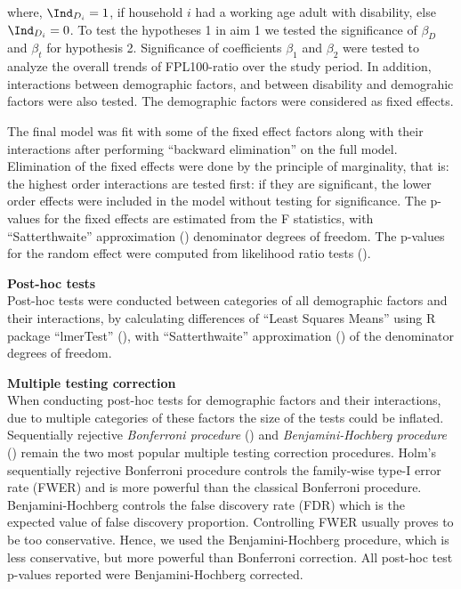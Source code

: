 \documentclass[11pt]{extarticle} %
\begin{document}
where, $\Ind_{D_i} = 1$, if household $i$ had a working age adult with disability, else $\Ind_{D_i} = 0$. To test the hypotheses 1 in aim 1 we tested the significance of $\beta_D$ and $\beta_t$ for hypothesis 2. Significance of coefficients $\beta_1$ and $\beta_2$ were tested to analyze the overall trends of FPL100-ratio over the study period. In addition, interactions between demographic factors, and between disability and demograhic factors were also tested. The demographic factors were considered as fixed effects.

The final model was fit with some of the fixed effect factors along with their interactions after performing ``backward elimination'' on the full model. Elimination of the fixed effects were done by the principle of marginality, that is: the highest order interactions are tested first: if they are significant, the lower order effects were included in the model without testing for significance. The p-values for the fixed effects are estimated from the F statistics, with ``Satterthwaite'' approximation (\cite{Satterthwaite_1946_Biometrics}) denominator degrees of freedom. The p-values for the random effect were computed from likelihood ratio tests (\cite{Morrell_1998_Biometrics}). 

\noindent
{\bf{Post-hoc tests}} \\
Post-hoc tests were conducted between categories of all demographic factors and their interactions, by calculating differences of ``Least Squares Means'' using R package ``lmerTest'' (\cite{Kuznetsova_etal_2015_R-lmerTest}), with ``Satterthwaite'' approximation (\cite{Satterthwaite_1946_Biometrics}) of the denominator degrees of freedom.

\noindent
{\bf{Multiple testing correction}}\\
When conducting post-hoc tests for demographic factors and their interactions, due to multiple categories of these factors the size of the tests could be inflated. Sequentially rejective {\emph{Bonferroni procedure}} (\cite{Holm_1979_SJS}) and {\emph{Benjamini-Hochberg procedure}} (\cite{Benjamini_Hochberg_1995_JRSSB}) remain the two most popular multiple testing correction procedures. Holm's sequentially rejective Bonferroni procedure controls the family-wise type-I error rate (FWER) and is more powerful than the classical Bonferroni procedure. Benjamini-Hochberg controls the false discovery rate (FDR) which is the expected value of false discovery proportion. Controlling FWER usually proves to be too conservative. Hence, we used the Benjamini-Hochberg procedure, which is less conservative, but more powerful than Bonferroni correction. All post-hoc test p-values reported were Benjamini-Hochberg corrected.
\end{document}
